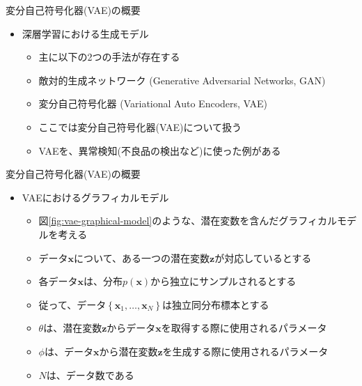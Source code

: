 \documentclass[dvipdfmx,notheorems,t]{beamer}
\begin{document}
\begin{frame}{変分自己符号化器(VAE)の概要}

\begin{itemize}
	\item 深層学習における生成モデル
	\begin{itemize}
		\item 主に以下の2つの手法が存在する
		\newline
		
		\item 敵対的生成ネットワーク (Generative Adversarial Networks, GAN)
		\item \alert{変分自己符号化器} (Variational Auto Encoders, \alert{VAE})
		\newline
		
		\item ここでは変分自己符号化器(VAE)について扱う
		\newline
		
		\item VAEを、異常検知(不良品の検出など)に使った例がある
	\end{itemize}
\end{itemize}

\end{frame}

\begin{frame}{変分自己符号化器(VAE)の概要}

\begin{itemize}
	\item VAEにおけるグラフィカルモデル
	\begin{itemize}
		\item 図\ref{fig:vae-graphical-model}のような、潜在変数を含んだグラフィカルモデルを考える
		\newline
		
		\item データ$\bm{x}$について、ある一つの潜在変数$\bm{z}$が対応しているとする
		\item 各データ$\bm{x}$は、分布$p(\bm{x})$から独立にサンプルされるとする
		\item 従って、データ$\left\{ \bm{x}_1, \ldots, \bm{x}_N \right\}$は\alert{独立同分布標本}とする
		\newline
		
		\item $\theta$は、\color{red}潜在変数$\bm{z}$からデータ$\bm{x}$\normalcolor を取得する際に使用されるパラメータ
		\item $\phi$は、\color{red}データ$\bm{x}$から潜在変数$\bm{z}$\normalcolor を生成する際に使用されるパラメータ
		\item $N$は、データ数である
	\end{itemize}
\end{itemize}

\end{frame}
\end{document}

